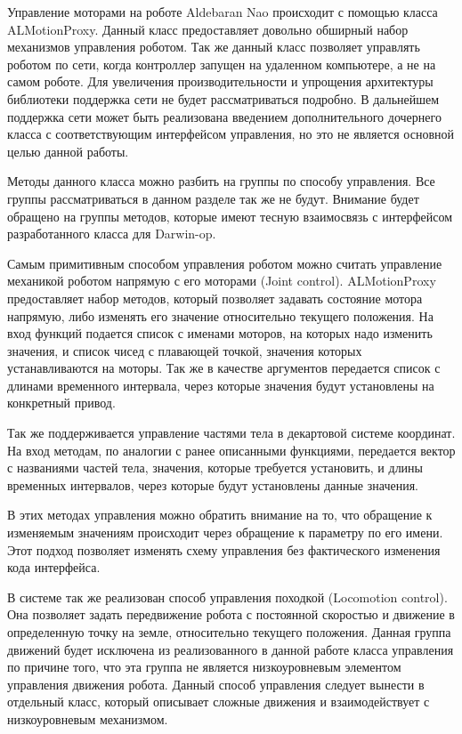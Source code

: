 Управление моторами на роботе Aldebaran Nao происходит с помощью класса ALMotionProxy. Данный класс предоставляет довольно обширный набор механизмов управления роботом. Так же данный класс позволяет управлять роботом по сети, когда контроллер запущен на удаленном компьютере, а не на самом роботе. Для увеличения производительности и упрощения архитектуры библиотеки поддержка сети не будет рассматриваться подробно. В дальнейшем поддержка сети может быть реализована введением дополнительного дочернего класса с соответствующим интерфейсом управления, но это не является основной целью данной работы.

Методы данного класса можно разбить на группы по способу управления. Все группы рассматриваться в данном разделе так же не будут. Внимание будет обращено на группы методов, которые имеют тесную взаимосвязь с интерфейсом разработанного класса для Darwin-op.

Самым примитивным способом управления роботом можно считать управление механикой роботом напрямую с его  моторами (Joint control).  ALMotionProxy предоставляет набор методов, который позволяет задавать состояние мотора напрямую, либо изменять его значение относительно текущего положения. На вход функций подается список с именами моторов, на которых надо изменить значения, и список чисед с плавающей точкой, значения которых устанавливаются на моторы. Так же в качестве аргументов передается список с длинами временного интервала, через которые значения будут установлены на конкретный привод.

Так же поддерживается управление частями тела в декартовой системе координат. На вход методам, по аналогии с ранее описанными функциями, передается вектор с названиями частей тела, значения, которые требуется установить, и длины временных интервалов, через которые будут установлены данные значения.

В этих методах управления можно обратить внимание на то, что обращение к изменяемым значениям происходит через обращение к параметру по его имени. Этот подход позволяет изменять схему управления без фактического изменения кода интерфейса.

В системе так же реализован способ управления походкой (Locomotion control). Она позволяет задать передвижение робота с постоянной скоростью и движение в определенную точку на земле, относительно текущего положения. Данная группа движений будет исключена из реализованного в данной работе класса управления по причине того, что эта группа не является низкоуровневым элементом управления движения робота. Данный способ управления следует вынести в отдельный класс, который описывает сложные движения и взаимодействует с низкоуровневым механизмом.

